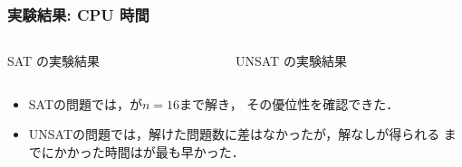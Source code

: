 \documentclass[dvipdfmx,10pt]{beamer}
\begin{document}
%
%

\begin{frame}\frametitle{実験結果: CPU 時間}
\begin{block}{}
  \begin{columns}
    \begin{column}{0.50\textwidth}
      \centering
      SAT の実験結果\\
      \vspace{4pt}
      \scalebox{0.7}{
        }
    \end{column}
    \begin{column}{0.50\textwidth}
      \centering
      UNSAT の実験結果\\
      \vspace{4pt}
      \scalebox{0.7}{
        }
    \end{column}
  \end{columns}
\end{block}
 \begin{itemize}
  \item SATの問題では，が$n=16$まで解き，
	その優位性を確認できた．
  \item UNSATの問題では，解けた問題数に差はなかったが，解なしが得られる
	までにかかった時間はが最も早かった．
 \end{itemize}
\end{frame}

%
%
\end{document}
